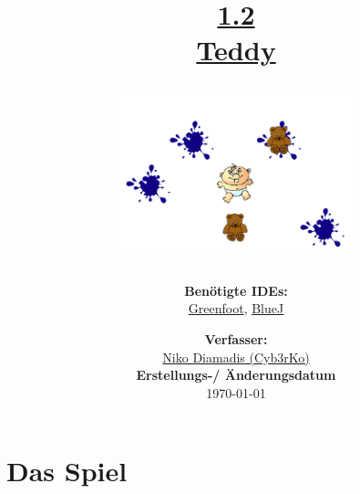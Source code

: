 \documentclass{scrartcl}   %
\begin{document}
\title{\huge{\href{https://www.inf-schule.de/programmierung/oopjava/klassen/aufbau}{1.2\\Teddy}}\\
\vspace{0.5cm}
\begin{figure}[ht]
	\centering
	\includegraphics[height=4.5cm]{Teddy.png}
\end{figure}
\vspace{0.7cm}}

\author{\textbf{Benötigte IDEs:}\\
\href{https://www.greenfoot.org/}{Greenfoot}, \href{https://www.bluej.org/}{BlueJ}
\vspace{1cm}}

\date{\textbf{Verfasser:}\\
\href{https://nikothegreek.jimdofree.com/}{Niko Diamadis (Cyb3rKo)}\\
\vspace{1cm}
\textbf{Erstellungs-/ Änderungsdatum}\\
\today\enlargethispage{4cm}}

\doublespacing

\maketitle\thispagestyle{empty}

\cleardoublepage

\setcounter{page}{1}
\tableofcontents


\newpage
{}  %

\cleardoublepage

\section{Das Spiel}
\end{document}
